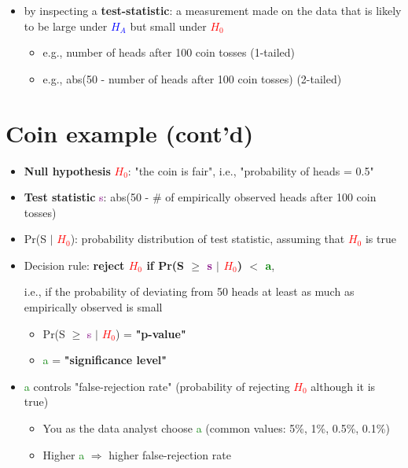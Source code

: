 \documentclass[11pt]{article}
\begin{document}
\begin{itemize}
	\item by inspecting a \textbf{test-statistic}: a measurement made on the data that is likely to be large under \textcolor{blue}{$H_A$} but small under \textcolor{red}{$H_0$}
		\begin{itemize}
			\item e.g., number of heads after 100 coin tosses (1-tailed)
			\item e.g., abs(50 - number of heads after 100 coin tosses) (2-tailed)
		\end{itemize}
\end{itemize}

\section*{Coin example (cont'd)}
\begin{itemize}
	\item \textbf{Null hypothesis} \textcolor{red}{$H_0$}: "the coin is fair", i.e., "probability of heads = 0.5"
	\item \textbf{Test statistic} \textcolor{purple}{s}: abs(50 - # of empirically observed heads after 100 coin tosses)
	\item Pr(S $\mid$ \textcolor{red}{$H_0$}): probability distribution of test statistic, assuming that \textcolor{red}{$H_0$} is true
\end{itemize}


\begin{itemize}
	\item Decision rule: \textbf{reject \textcolor{red}{$H_0$} if Pr(S $\geq$  \textcolor{purple}{s} $\mid$  \textcolor{red}{$H_0$}) $<$ \textcolor{green}{a}},

i.e., if the probability of deviating from 50 heads at least as much as empirically observed is small
\begin{itemize}
	\item Pr(S $\geq$  \textcolor{purple}{s} $\mid$ \textcolor{red}{$H_0$}) = \textbf{"p-value"}
	\item \textcolor{green}{a} = \textbf{"significance level"}
\end{itemize}
\end{itemize}

\begin{itemize}
	\item \textcolor{green}{a} controls "false-rejection rate" (probability of rejecting \textcolor{red}{$H_0$} although it is true)
	\begin{itemize}
		\item You as the data analyst choose \textcolor{green}{a} (common values: 5\%, 1\%, 0.5\%, 0.1\%) 
		\item Higher \textcolor{green}{a} $\Rightarrow$ higher false-rejection rate
	\end{itemize}
		
\end{itemize}
\end{document}

